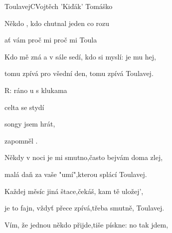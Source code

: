 \begin{song}{Toulavej}{C}{Vojtěch 'Kiďák' Tomáško}

\begin{SBVerse}

Někdo , kdo chutnal  jeden  co rozu

ať vám  proč mi  proč mi  Toula

\end{SBVerse}

\begin{SBVerse}

Kdo mě zná a v sále sedí, kdo si myslí: je mu hej,

tomu zpívá pro všední den, tomu zpívá Toulavej.

\end{SBVerse}

\begin{SBChorus}

R:  ráno  u  s klukama 

 celta se  stydí

 songy jsem  hrát,

zapomněl .

\end{SBChorus}

\begin{SBVerse}

Někdy v noci je mi smutno,často bejvám doma zlej,

malá daň za vaše "umí",kterou splácí Toulavej.

\end{SBVerse}

\begin{SBVerse}

Každej měsíc jiná štace,čekáš, kam tě uložej',

je to fajn, vždyť přece zpívá,třeba smutně, Toulavej.

\end{SBVerse}

\begin{SBChorus}

\end{SBChorus}

\begin{SBVerse}

Vím, že jednou někdo přijde,tiše pískne: no tak jdem,


\end{SBVerse}
\end{song}

